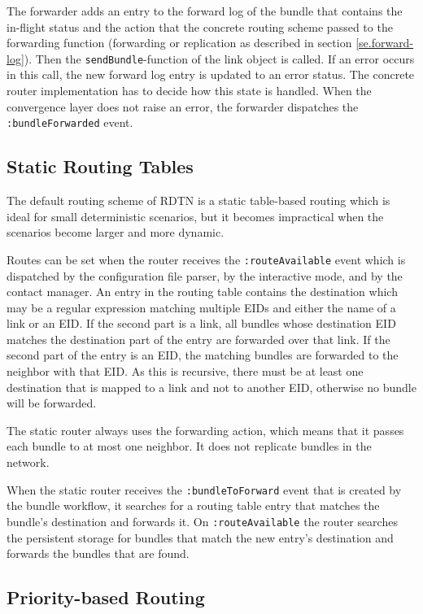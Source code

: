 \documentclass[a4paper]{article}
\begin{document}
The forwarder adds an entry to the forward log of the bundle that contains the
in-flight status and the action that the concrete routing scheme passed to
the forwarding function (forwarding or replication as described in section
\ref{se.forward-log}). Then the {\tt sendBundle}-function of the link object
is called. If an error occurs in this call, the new forward log entry is updated
to an error status. The concrete router implementation has to decide how this
state is handled. When the convergence layer does not raise an error, the
forwarder dispatches the {\tt :bundleForwarded} event.

\subsection{Static Routing Tables}\label{sec.static-routing}

The default routing scheme of RDTN is a static table-based routing which is
ideal for small deterministic scenarios, but it becomes impractical when the
scenarios become larger and more dynamic.

Routes can be set when the router receives the {\tt :routeAvailable} event which
is dispatched by the configuration file parser, by the interactive mode, and by
the contact manager.  An entry in the routing table contains the destination
which may be a regular expression matching multiple EIDs and either the name of
a link or an EID. If the second part is a link, all bundles whose destination
EID matches the destination part of the entry are forwarded over that link. If
the second part of the entry is an EID, the matching bundles are forwarded to
the neighbor with that EID. As this is recursive, there must be at least one
destination that is mapped to a link and not to another EID, otherwise no bundle
will be forwarded.

The static router always uses the forwarding action, which means that it
passes each bundle to at most one neighbor. It does not replicate bundles in the
network.

When the static router receives the {\tt :bundleToForward} event that is created
by the bundle workflow, it searches for a routing table entry that matches the
bundle's destination and forwards it.  On {\tt :routeAvailable} the router
searches the persistent storage for bundles that match the new entry's
destination and forwards the bundles that are found.

\subsection{Priority-based Routing}\label{sec.prio-routing}
\end{document}
